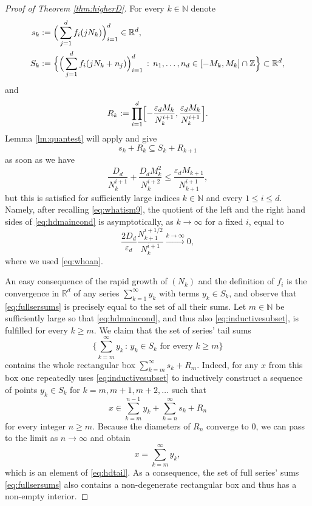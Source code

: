 \documentclass[11pt,letterpaper,reqno]{amsart}
\numberwithin{equation}{section}
\theoremstyle{definition}
\numberwithin{equation}{section}
\begin{document}
\begin{proof}[Proof of Theorem \ref{thm:higherD}]
For every $k\in\mathbb{N}$ denote
\begin{align*}
s_k & := \Big( \sum_{j=1}^{d} f_i(j N_k) \Big)_{i=1}^{d} \in \mathbb{R}^d, \\
S_k & := \Bigl\{ \Big( \sum_{j=1}^{d} f_i(j N_k + n_j) \Big)_{i=1}^{d} \,:\, n_1,\ldots,n_d\in[-M_k,M_k]\cap\mathbb{Z} \Bigr\} \subset \mathbb{R}^d,
\end{align*}
and
\[ R_k := \prod_{i=1}^{d} \Bigl[ -\frac{\varepsilon_d M_k}{N_k^{i+1}}, \frac{\varepsilon_d M_k}{N_k^{i+1}} \Bigr]. \]
Lemma \ref{lm:quantest} will apply and give
\begin{equation}\label{eq:inductivesubset}
s_k + R_k \subseteq S_k + R_{k+1}
\end{equation}
as soon as we have
\begin{equation}\label{eq:hdmaincond}
\frac{D_d}{N_k^{i+1}} + \frac{D_d M_k^2}{N_k^{i+2}} \leqslant \frac{\varepsilon_d M_{k+1}}{N_{k+1}^{i+1}},
\end{equation}
but this is satisfied for sufficiently large indices $k\in\mathbb{N}$ and every $1\leqslant i\leqslant d$.
Namely, after recalling \eqref{eq:whatism9}, the quotient of the left and the right hand sides of \eqref{eq:hdmaincond} is asymptotically, as $k\to\infty$ for a fixed $i$, equal to
\[ \frac{2D_d}{\varepsilon_d} \frac{N_{k+1}^{i+1/2}}{N_k^{i+1}} \stackrel{k\to\infty}{\longrightarrow} 0, \]
where we used \eqref{eq:whoan}.

An easy consequence of the rapid growth of $(N_k)$ and the definition of $f_i$ is the convergence in $\mathbb{R}^d$ of any series $\sum_{k=1}^{\infty} y_k$ with terms $y_k\in S_k$,
and observe that \eqref{eq:fullsersums} is precisely equal to the set of all their sums.
Let $m\in\mathbb{N}$ be sufficiently large so that \eqref{eq:hdmaincond}, and thus also \eqref{eq:inductivesubset}, is fulfilled for every $k\geqslant m$.
We claim that the set of series' tail sums
\begin{equation}\label{eq:hdtail}
\Big\{ \sum_{k=m}^{\infty} y_k \,:\, y_k\in S_k \text{ for every } k\geqslant m \Big\}
\end{equation}
contains the whole rectangular box $\sum_{k=m}^{\infty} s_k + R_m$.
Indeed, for any $x$ from this box one repeatedly uses \eqref{eq:inductivesubset} to inductively construct a sequence of points $y_k\in S_k$ for $k=m,m+1,m+2,\ldots$ such that
\[ x \in \sum_{k=m}^{n-1} y_k + \sum_{k=n}^{\infty} s_k + R_n \]
for every integer $n\geqslant m$. Because the diameters of $R_n$ converge to $0$, we can pass to the limit as $n\to\infty$ and obtain
\[ x = \sum_{k=m}^{\infty} y_k, \]
which is an element of \eqref{eq:hdtail}.
As a consequence, the set of full series' sums \eqref{eq:fullsersums} also contains a non-degenerate rectangular box and thus has a non-empty interior.
\end{proof}
\end{document}
